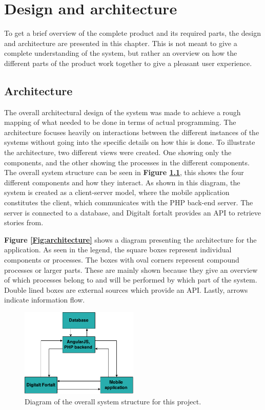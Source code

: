 
\chapter{Design and architecture}

To get a brief overview of the complete product and its required parts, the design and architecture are presented in this chapter. This is not meant to give a complete understanding of the system, but rather an overview on how the different parts of the product work together to give a pleasant user experience.

\section{Architecture}

The overall architectural design of the system was made to achieve a rough mapping of what needed to be done in terms of actual programming. The architecture focuses heavily on interactions between the different instances of the systems without going into the specific details on how this is done. To illustrate the architecture, two different views were created. One showing only the components, and the other showing the processes in the different components. The overall system structure can be seen in \textbf{Figure \ref{Fig:system_structure}}, this shows the four different components and how they interact. As shown in this diagram, the system is created as a client-server model, where the mobile application constitutes the client, which communicates with the PHP back-end server. The server is connected to a database, and Digitalt fortalt provides an API to retrieve stories from.\newline

\textbf{Figure \ref{Fig:architecture}} shows a diagram presenting the architecture for the application. As seen in the legend, the square boxes represent individual components or processes. The boxes with oval corners represent compound processes or larger parts. These are mainly shown because they give an overview of which processes belong to and will be performed by which part of the system. Double lined boxes are external sources which provide an API. Lastly, arrows indicate information flow.\newline

\begin{figure}[h!]
	\centering
	\includegraphics[width=0.5\textwidth]{fig/system_structure}
	\caption{Diagram of the overall system structure for this project.}
	\label{Fig:system_structure}
\end{figure}

